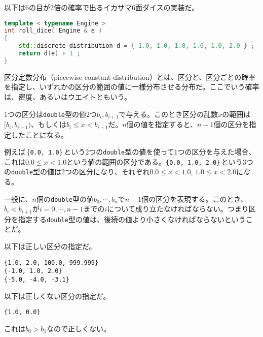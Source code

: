 
以下は6の目が2倍の確率で出るイカサマ6面ダイスの実装だ。

\begin{lstlisting}[language={C++}]
template < typename Engine >
int roll_dice( Engine & e )
{
    std::discrete_distribution d = { 1.0, 1.0, 1.0, 1.0, 1.0, 2.0 } ;
    return d(e) + 1 ;
}
\end{lstlisting}



区分定数分布（piecewise constant distribution）とは、区分と、区分ごとの確率を指定し、いずれかの区分の範囲の値に一様分布させる分布だ。ここでいう確率は、密度、あるいはウエイトともいう。

1つの区分は\texttt{double}型の値2つ\(b_i, b_{i+1}\)で与える。このとき区分の乱数\(x\)の範囲は\([b_i, b_{i+1})\)、もしくは\(b_i \leq x < b_{i+1}\)だ。\(n\)個の値を指定すると、\(n-1\)個の区分を指定したことになる。

例えば\,\texttt{\{0.0, 1.0\}}\,という2つの\texttt{double}型の値を使って1つの区分を与えた場合、これは\(0.0 \leq x < 1.0\)という値の範囲の区分である。\texttt{\{0.0, 1.0, 2.0\}}\,という3つの\texttt{double}型の値は2つの区分になり、それぞれ\(0.0 \leq x < 1.0\), \(1.0 \leq x < 2.0\)になる。

一般に、\(n\)個の\texttt{double}型の値\(b_0, \cdots, b_n\)で\(n-1\)個の区分を表現する。このとき、\(b_i < b_{i+1}\)が\(i = 0, \cdots, n-1\)までの\(i\)について成り立たなければならない。つまり区分を指定する\texttt{double}型の値は、後続の値より小さくなければならないということだ。

以下は正しい区分の指定だ。

\begin{lstlisting}[style=terminal]
{1.0, 2.0, 100.0, 999.999}
{-1.0, 1.0, 2.0}
{-5.0, -4.0, -3.1}
\end{lstlisting}

以下は正しくない区分の指定だ。

\begin{lstlisting}[style=terminal]
{1.0, 0.0}
\end{lstlisting}

これは\(b_0 > b_1\)なので正しくない。

